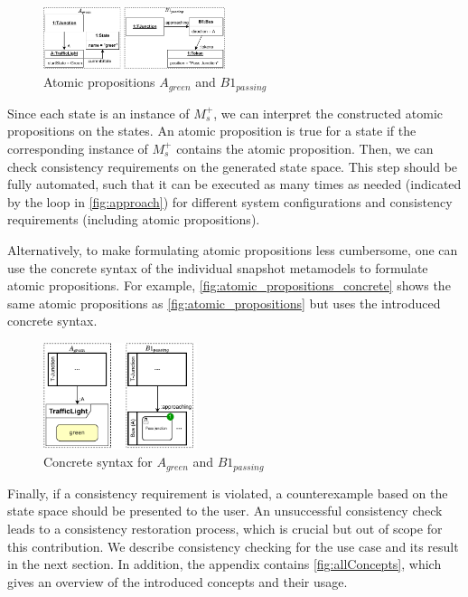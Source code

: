 \documentclass{jot}
\begin{document}
\begin{figure}[h]
    \centering
    \includegraphics[width=0.475\textwidth]{figures/atomic_props.pdf}
    \caption{Atomic propositions $A_{green}$ and $B1_{passing}$}
    \label{fig:atomic_propositions}
\end{figure}

Since each state is an instance of $M_s^+$, we can interpret the constructed atomic propositions on the states.
An atomic proposition is true for a state if the corresponding instance of $M_s^+$ contains the atomic proposition.
Then, we can check consistency requirements on the generated state space.
This step should be fully automated, such that it can be executed as many times as needed (indicated by the loop in \autoref{fig:approach}) for different system configurations and consistency requirements (including atomic propositions).

Alternatively, to make formulating atomic propositions less cumbersome, one can use the concrete syntax of the individual snapshot metamodels to formulate atomic propositions.
For example, \autoref{fig:atomic_propositions_concrete} shows the same atomic propositions as \autoref{fig:atomic_propositions} but uses the introduced concrete syntax.

\begin{figure}[h]
    \centering
    \includegraphics[width=0.4\textwidth]{figures/atomic_props_concrete.pdf}
    \caption{Concrete syntax for $A_{green}$ and $B1_{passing}$}
    \label{fig:atomic_propositions_concrete}
\end{figure}

Finally, if a consistency requirement is violated, a counterexample based on the state space should be presented to the user.
An unsuccessful consistency check leads to a consistency restoration process, which is crucial but out of scope for this contribution.
We describe consistency checking for the use case and its result in the next section.
In addition, the appendix contains \autoref{fig:allConcepts}, which gives an overview of the introduced concepts and their usage.
\end{document}
